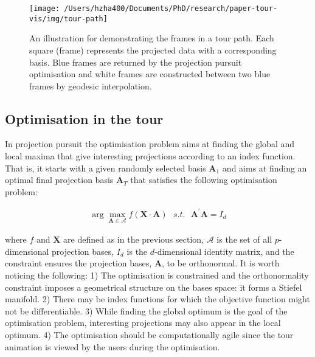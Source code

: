 \begin{Schunk}
\begin{figure}

{\centering \texttt{[image: /Users/hzha400/Documents/PhD/research/paper-tour-vis/img/tour-path]} 

}

\caption[An illustration for demonstrating the frames in a tour path]{An illustration for demonstrating the frames in a tour path. Each square (frame) represents the projected data with a corresponding basis. Blue frames are returned by the projection pursuit optimisation and white frames are constructed between two blue frames by geodesic interpolation.}\label{fig:tour-path}
\end{figure}
\end{Schunk}

\hypertarget{tour-optim}{%
\subsection{Optimisation in the tour}\label{tour-optim}}

In projection pursuit the optimisation problem aims at finding the
global and local maxima that give interesting projections according to
an index function. That is, it starts with a given randomly selected
basis \(\mathbf{A}_1\) and aims at finding an optimal final projection
basis \(\mathbf{A}_T\) that satisfies the following optimisation
problem:

\begin{align}
\arg \max_{\mathbf{A} \in \mathcal{A}} f(\mathbf{X} \cdot \mathbf{A})  ~~~ s.t. ~~~ \mathbf{A}^{\prime} \mathbf{A} = I_d
\end{align}

\noindent where \(f\) and \(\mathbf{X}\) are defined as in the previous
section, \(\mathcal{A}\) is the set of all \(p\)-dimensional projection
bases, \(I_d\) is the \(d\)-dimensional identity matrix, and the
constraint ensures the projection bases, \(\mathbf{A}\), to be
orthonormal. It is worth noticing the following: 1) The optimisation is
constrained and the orthonormality constraint imposes a geometrical
structure on the bases space: it forms a Stiefel manifold. 2) There may
be index functions for which the objective function might not be
differentiable. 3) While finding the global optimum is the goal of the
optimisation problem, interesting projections may also appear in the
local optimum. 4) The optimisation should be computationally agile since
the tour animation is viewed by the users during the optimisation.

